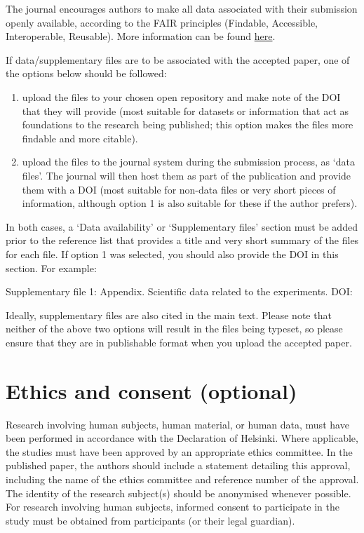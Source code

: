 \documentclass[charis,linguex,biblatex]{glossa}
\begin{document}
The journal encourages authors to make all data associated with their submission openly available, according to the FAIR principles (Findable, Accessible, Interoperable, Reusable). More information can be found \href{https://www.glossa-journal.org/site/editorial-policies/#data-policy}{here}.

If data/supplementary files are to be associated with the accepted paper, one of the options below should be followed:
\begin{enumerate}
\item upload the files to your chosen open repository and make note of the DOI that they will provide (most suitable for datasets or information that act as foundations to the research being published; this option makes the files more findable and more citable).
\item upload the files to the journal system during the submission process, as `data files'. The journal will then host them as part of the publication and provide them with a DOI (most suitable for non-data files or very short pieces of information, although option 1 is also suitable for these if the author prefers).
\end{enumerate}

\noindent In both cases, a `Data availability' or `Supplementary files' section must be added prior to the reference list that provides a title and very short summary of the files for each file. If option 1 was selected, you should also provide the DOI in this section. For example:

\noindent Supplementary file 1: Appendix. Scientific data related to the experiments. DOI: 

Ideally, supplementary files are also cited in the main text. Please note that neither of the above two options will result in the files being typeset, so please ensure that they are in publishable format when you upload the accepted paper.


\section*{Ethics and consent (optional)}

Research involving human subjects, human material, or human data, must have been performed in accordance with the Declaration of Helsinki. Where applicable, the studies must have been approved by an appropriate ethics committee. In the published paper, the authors should include a statement detailing this approval, including the name of the ethics committee and reference number of the approval. The identity of the research subject(s) should be anonymised whenever possible. For research involving human subjects, informed consent to participate in the study must be obtained from participants (or their legal guardian).
\end{document}
